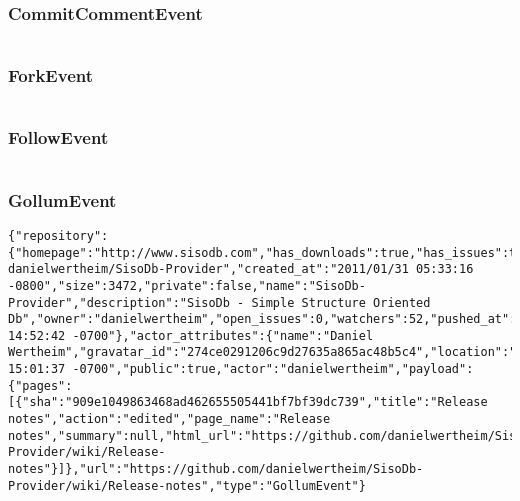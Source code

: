 \documentclass[a4paper,10pt]{article}
\begin{document}
\subsubsection{CommitCommentEvent}
\begin{lstlisting}

\end{lstlisting}

\subsubsection{ForkEvent}
\begin{lstlisting}

\end{lstlisting}

\subsubsection{FollowEvent}
\begin{lstlisting}

\end{lstlisting}


\subsubsection{GollumEvent}
\begin{lstlisting}
{"repository":{"homepage":"http://www.sisodb.com","has_downloads":true,"has_issues":true,"forks":4,"language":"C#","fork":false,"has_wiki":true,"url":"https://github.com/
danielwertheim/SisoDb-Provider","created_at":"2011/01/31 05:33:16 -0800","size":3472,"private":false,"name":"SisoDb-Provider","description":"SisoDb - Simple Structure Oriented Db","owner":"danielwertheim","open_issues":0,"watchers":52,"pushed_at":"2012/04/11 14:52:42 -0700"},"actor_attributes":{"name":"Daniel Wertheim","gravatar_id":"274ce0291206c9d27635a865ac48b5c4","location":"Sweden","blog":"http://daniel.wertheim.se","type":"User","login":"danielwertheim"},"created_at":"2012/04/11 15:01:37 -0700","public":true,"actor":"danielwertheim","payload":{"pages":[{"sha":"909e1049863468ad462655505441bf7bf39dc739","title":"Release notes","action":"edited","page_name":"Release notes","summary":null,"html_url":"https://github.com/danielwertheim/SisoDb-Provider/wiki/Release-notes"}]},"url":"https://github.com/danielwertheim/SisoDb-Provider/wiki/Release-notes","type":"GollumEvent"}
\end{lstlisting}
\end{document}
